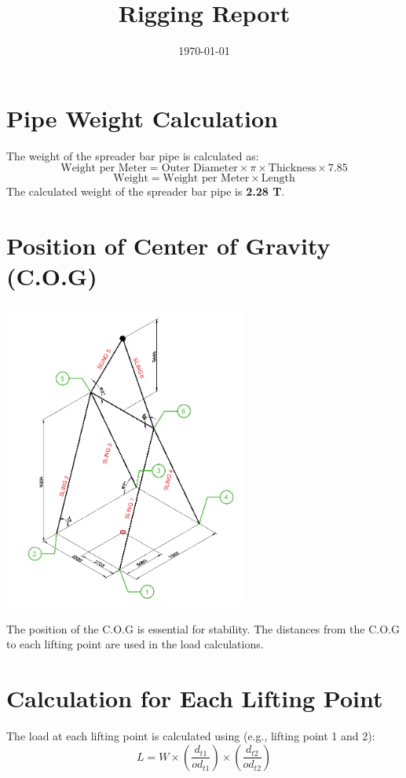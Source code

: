 \documentclass[12pt]{article}
\title{Rigging Report}
\author{}
\date{\today}
\begin{document}
\maketitle

\section{Pipe Weight Calculation}
The weight of the spreader bar pipe is calculated as:
\[
\text{Weight per Meter} = \text{Outer Diameter} \times \pi \times \text{Thickness} \times 7.85
\]
\[
\text{Weight} = \text{Weight per Meter} \times \text{Length}
\]
The calculated weight of the spreader bar pipe is \textbf{2.28 T}.

\section{Position of Center of Gravity (C.O.G)}
\begin{center}
\includegraphics[width=0.6\textwidth]{image-3.png}
\end{center}
The position of the C.O.G is essential for stability. The distances from the C.O.G to each lifting point are used in the load calculations.

\section{Calculation for Each Lifting Point}
The load at each lifting point is calculated using (e.g., lifting point 1 and 2):
\[
L = W \times \left( \frac{d_{t1}}{od_{t1}} \right) \times \left( \frac{d_{t2}}{od_{t2}} \right)
\]
\end{document}
